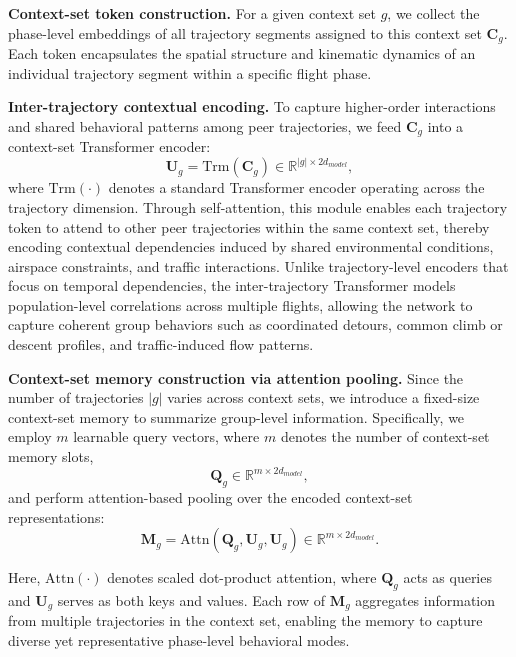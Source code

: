 \documentclass[iicol,pdflatex,sn-basic,Numbered]{sn-jnl}%
\theoremstyle{thmstyleone}%
\theoremstyle{thmstyletwo}%
\theoremstyle{thmstylethree}%
\begin{document}
\textbf{Context-set token construction.}
For a given context set $g$, we collect the phase-level embeddings of all trajectory segments assigned to this context set $\mathbf{C}_g$.
Each token encapsulates the spatial structure and kinematic dynamics of an individual trajectory segment within a specific flight phase.

\textbf{Inter-trajectory contextual encoding.}
To capture higher-order interactions and shared behavioral patterns among peer trajectories, we feed $\mathbf{C}_g$ into a context-set Transformer encoder:
\begin{equation}
\mathbf{U}_g = \mathrm{Trm}(\mathbf{C}_g)
\in \mathbb{R}^{|g| \times 2d_{model}},
\end{equation}
where $\mathrm{Trm}(\cdot)$ denotes a standard Transformer encoder operating across the trajectory dimension. 
Through self-attention, this module enables each trajectory token to attend to other peer trajectories within the same context set, thereby encoding contextual dependencies induced by shared environmental conditions, airspace constraints, and traffic interactions.
Unlike trajectory-level encoders that focus on temporal dependencies, the inter-trajectory Transformer models population-level correlations across multiple flights, allowing the network to capture coherent group behaviors such as coordinated detours, common climb or descent profiles, and traffic-induced flow patterns.

\textbf{Context-set memory construction via attention pooling.}
Since the number of trajectories $|g|$ varies across context sets, we introduce a fixed-size context-set memory to summarize group-level information. Specifically, we employ $m$ learnable query vectors, where $m$ denotes the number of context-set memory slots,
\begin{equation}
\mathbf{Q}_g \in \mathbb{R}^{m \times 2d_{model}},
\end{equation}
and perform attention-based pooling over the encoded context-set representations:
\begin{equation}
\label{eq:inter_traj}
\mathbf{M}_g = \mathrm{Attn}(\mathbf{Q}_g, \mathbf{U}_g, \mathbf{U}_g)
\in \mathbb{R}^{m \times 2d_{model}}.
\end{equation}

Here, $\mathrm{Attn}(\cdot)$ denotes scaled dot-product attention, where $\mathbf{Q}_g$ acts as queries and $\mathbf{U}_g$ serves as both keys and values. Each row of $\mathbf{M}_g$ aggregates information from multiple trajectories in the context set, enabling the memory to capture diverse yet representative phase-level behavioral modes.
\end{document}
